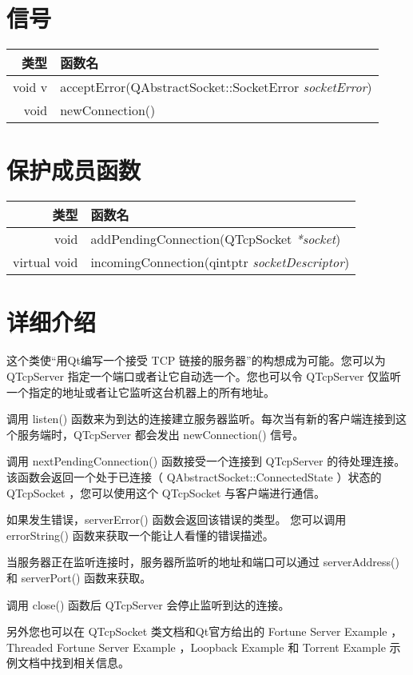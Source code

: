 \section{信号}

\begin{tabular}{|r|l|}
	\hline
	类型	 & 函数名 \\
	\hline
void	v & acceptError(QAbstractSocket::SocketError \emph{socketError}) \\
\hline
void	 & newConnection() \\
	\hline 
\end{tabular}

\section{保护成员函数}

\begin{tabular}{|r|l|}
	\hline
	类型	 & 函数名 \\
	\hline
void	 &  addPendingConnection(QTcpSocket \emph{*socket}) \\ 
\hline
virtual void	 & incomingConnection(qintptr \emph{socketDescriptor}) \\ 
	\hline 
\end{tabular}

\section{详细介绍}

这个类使“用Qt编写一个接受 TCP 链接的服务器”的构想成为可能。您可以为 QTcpServer 指定一个端口或者让它自动选一个。您也可以令 QTcpServer 仅监听一个指定的地址或者让它监听这台机器上的所有地址。

调用 listen() 函数来为到达的连接建立服务器监听。每次当有新的客户端连接到这个服务端时，QTcpServer 都会发出 newConnection() 信号。

调用 nextPendingConnection() 函数接受一个连接到 QTcpServer 的待处理连接。 该函数会返回一个处于已连接（ QAbstractSocket::ConnectedState ）状态的 QTcpSocket ，您可以使用这个 QTcpSocket 与客户端进行通信。

如果发生错误，serverError() 函数会返回该错误的类型。 您可以调用 errorString() 函数来获取一个能让人看懂的错误描述。

当服务器正在监听连接时，服务器所监听的地址和端口可以通过 serverAddress() 和 serverPort() 函数来获取。

调用 close() 函数后 QTcpServer 会停止监听到达的连接。

另外您也可以在 QTcpSocket 类文档和Qt官方给出的 Fortune Server Example ，Threaded Fortune Server Example ，Loopback Example 和 Torrent Example 示例文档中找到相关信息。

